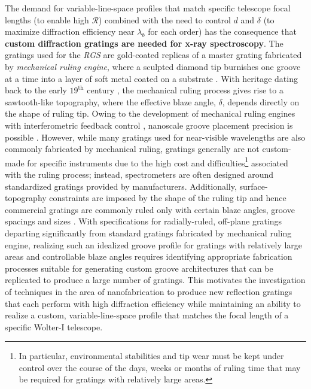 The demand for variable-line-space profiles that match specific telescope focal lengths (to enable high $\mathscr{R}$) combined with the need to control $d$ and $\delta$ (to maximize diffraction efficiency near $\lambda_b$ for each order) has the consequence that \textbf{custom diffraction gratings are needed for x-ray spectroscopy}. 
The gratings used for the \emph{RGS} are gold-coated replicas of a master grating fabricated by \emph{mechanical ruling engine}, where a sculpted diamond tip burnishes one groove at a time into a layer of soft metal coated on a substrate \cite{Kahn96,denHerder01}. 
With heritage dating back to the early $19^{\text{th}}$ century \cite{Fraunhofer1823,Compton25}, the mechanical ruling process gives rise to a sawtooth-like topography, where the effective blaze angle, $\delta$, depends directly on the shape of ruling tip. 
Owing to the development of mechanical ruling engines with interferometric feedback control \cite{Harrison49,Harrison55}, nanoscale groove placement precision is possible \cite{Loewen97}. 
However, while many gratings used for near-visible wavelengths are also commonly fabricated by mechanical ruling, gratings generally are not custom-made for specific instruments due to the high cost and difficulties\footnote{In particular, environmental stabilities and tip wear must be kept under control over the course of the days, weeks or months of ruling time that may be required for gratings with relatively large areas.} associated with the ruling process; instead, spectrometers are often designed around standardized gratings provided by manufacturers. 
Additionally, surface-topography constraints are imposed by the shape of the ruling tip and hence commercial gratings are commonly ruled only with certain blaze angles, groove spacings and sizes \cite{Loewen97}. 
With specifications for radially-ruled, off-plane gratings departing significantly from standard gratings fabricated by mechanical ruling engine, realizing such an idealized groove profile for gratings with relatively large areas and controllable blaze angles requires identifying appropriate fabrication processes suitable for generating custom groove architectures that can be replicated to produce a large number of gratings. 
This motivates the investigation of techniques in the area of nanofabrication to produce new reflection gratings that each perform with high diffraction efficiency while maintaining an ability to realize a custom, variable-line-space profile that matches the focal length of a specific Wolter-I telescope. 

